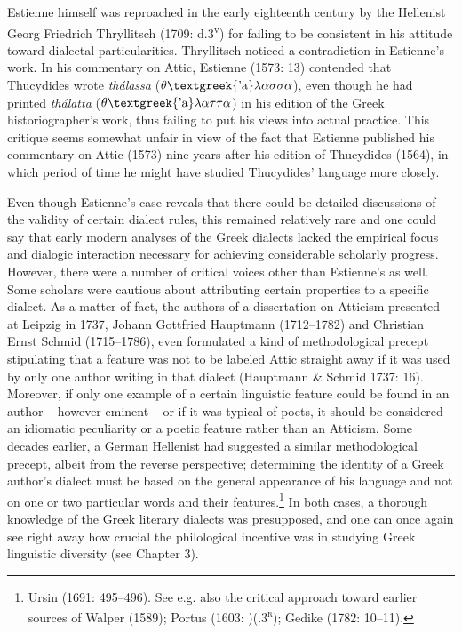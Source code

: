 \documentclass[12pt]{article}
\newenvironment{styleStandard}{\renewcommand\baselinestretch{1.25}\setlength\leftskip{0in}\setlength\rightskip{0in}\setlength\parindent{0.1972in}\setlength\parfillskip{0pt plus 1fil}\setlength\parskip{0in plus 1pt}\writerlistparindent\writerlistleftskip\leavevmode\normalfont\normalsize\writerlistlabel\ignorespaces}{\unskip\vspace{0in plus 1pt}\par}
\newcommand\writerlistleftskip{}
\newcommand\writerlistparindent{}
\newcommand\writerlistlabel{}
\begin{document}
\begin{styleStandard}
Estienne himself was reproached in the early eighteenth century by the Hellenist Georg Friedrich Thryllitsch (1709: d.3\textsuperscript{v}) for failing to be consistent in his attitude toward dialectal particularities. Thryllitsch noticed a contradiction in Estienne’s work. In his commentary on Attic, Estienne (1573: 13) contended that Thucydides wrote \textit{thálassa} ($\theta \text{\textgreek{'a}}\lambda \alpha \sigma \sigma \alpha $), even though he had printed \textit{thálatta} ($\theta \text{\textgreek{'a}}\lambda \alpha \tau \tau \alpha $) in his edition of the Greek historiographer’s work, thus failing to put his views into actual practice. This critique seems somewhat unfair in view of the fact that Estienne published his commentary on Attic (1573) nine years after his edition of Thucydides (1564), in which period of time he might have studied Thucydides’ language more closely.
\end{styleStandard}

\begin{styleStandard}
Even though Estienne’s case reveals that there could be detailed discussions of the validity of certain dialect rules, this remained relatively rare and one could say that early modern analyses of the Greek dialects lacked the empirical focus and dialogic interaction necessary for achieving considerable scholarly progress. However, there were a number of critical voices other than Estienne’s as well. Some scholars were cautious about attributing certain properties to a specific dialect. As a matter of fact, the authors of a dissertation on Atticism presented at Leipzig in 1737, Johann Gottfried Hauptmann (1712–1782) and Christian Ernst Schmid (1715–1786), even formulated a kind of methodological precept stipulating that a feature was not to be labeled Attic straight away if it was used by only one author writing in that dialect (Hauptmann \& Schmid 1737: 16). Moreover, if only one example of a certain linguistic feature could be found in an author – however eminent – or if it was typical of poets, it should be considered an idiomatic peculiarity or a poetic feature rather than an Atticism. Some decades earlier, a German Hellenist had suggested a similar methodological precept, albeit from the reverse perspective; determining the identity of a Greek author’s dialect must be based on the general appearance of his language and not on one or two particular words and their features.\footnote{ Ursin (1691: 495–496). See e.g. also the critical approach toward earlier sources of Walper (1589); Portus (1603: )(.3\textsc{\textsuperscript{r}}); Gedike (1782: 10–11).} In both cases, a thorough knowledge of the Greek literary dialects was presupposed, and one can once again see right away how crucial the philological incentive was in studying Greek linguistic diversity (see Chapter 3).
\end{styleStandard}
\end{document}
